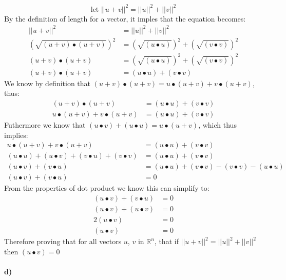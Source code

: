 \documentclass[11pt]{article}
\begin{document}
\[ \text{let } ||u+v||^2 = ||u||^2 + ||v||^2 \]
By the definition of length for a vector, it imples that the equation becomes: 
\begin{align*}
||u + v||^2 &=||u||^2 + ||v||^2 \\
(\sqrt{(u + v) \bullet (u + v)})^2 &= (\sqrt{(u \bullet u)})^2 + (\sqrt{(v \bullet v)})^2 \\
(u + v) \bullet (u + v) &= (\sqrt{(u \bullet u)})^2 + (\sqrt{(v \bullet v)})^2 \\
(u + v) \bullet (u + v) &= (u \bullet u) + (v \bullet v) 
\end{align*}
We know by definition that $(u + v) \bullet (u + v)  = u \bullet (u + v) +  v \bullet (u + v)$, thus:
\begin{align*}
(u + v) \bullet (u + v) &= (u \bullet u) + (v \bullet v) \\
u \bullet (u + v) +  v \bullet (u + v)   &= (u \bullet u) + (v \bullet v)  
\end{align*}
Futhermore we know that $(u \bullet v) + (u \bullet u) = u \bullet (u+ v)$, which thus implies:
\begin{align*}
u \bullet (u + v) +  v \bullet (u + v)   &= (u \bullet u) + (v \bullet v) \\
(u \bullet u) + (u \bullet v)  + (v \bullet u) + (v \bullet v)   &= (u \bullet u) + (v \bullet v) \\
(u \bullet v)  + (v \bullet u) &= (u \bullet u) + (v \bullet v) -   (v \bullet v)  - (u \bullet u)\\
(u \bullet v)  + (v \bullet u) &= 0
\end{align*}
From the properties of dot product we know this can simplify to:
\begin{align*}
(u \bullet v)  + (v \bullet u) &= 0\\
(u \bullet v)  + (u \bullet v) &= 0\\
2(u \bullet v) &= 0\\
(u \bullet v) &= 0
\end{align*}
Therefore proving that for all vectors $u$, $v$ in  $\mathbb{R}^n$, that if $||u + v||^2 =||u||^2 + ||v||^2$ then $(u \bullet v) = 0$\\\\
\textbf{d)}
\end{document}
